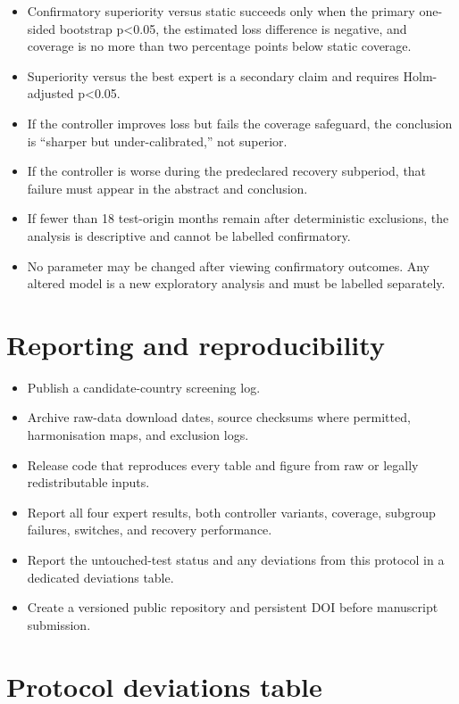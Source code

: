 \documentclass[11pt,a4paper]{article}
\begin{document}
\begin{itemize}
\item Confirmatory superiority versus static succeeds only when the primary one-sided bootstrap p\textless0.05, the estimated loss difference is negative, and coverage is no more than two percentage points below static coverage.
\item Superiority versus the best expert is a secondary claim and requires Holm-adjusted p\textless0.05.
\item If the controller improves loss but fails the coverage safeguard, the conclusion is ``sharper but under-calibrated,'' not superior.
\item If the controller is worse during the predeclared recovery subperiod, that failure must appear in the abstract and conclusion.
\item If fewer than 18 test-origin months remain after deterministic exclusions, the analysis is descriptive and cannot be labelled confirmatory.
\item No parameter may be changed after viewing confirmatory outcomes. Any altered model is a new exploratory analysis and must be labelled separately.
\end{itemize}

\section{Reporting and reproducibility}\label{reporting-and-reproducibility}

\begin{itemize}
\item Publish a candidate-country screening log.
\item Archive raw-data download dates, source checksums where permitted, harmonisation maps, and exclusion logs.
\item Release code that reproduces every table and figure from raw or legally redistributable inputs.
\item Report all four expert results, both controller variants, coverage, subgroup failures, switches, and recovery performance.
\item Report the untouched-test status and any deviations from this protocol in a dedicated deviations table.
\item Create a versioned public repository and persistent DOI before manuscript submission.
\end{itemize}

\section{Protocol deviations table}\label{protocol-deviations-table}
\end{document}

